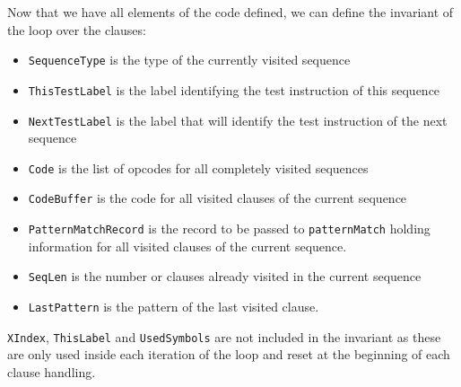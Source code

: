 \documentclass[a4paper]{memoir}
\begin{document}
Now that we have all elements of the code defined, we can define the invariant
of the loop over the clauses:

\begin{itemize}
  \item \lstinline!SequenceType! is the type of the currently visited sequence 
  \item \lstinline!ThisTestLabel! is the label identifying the test instruction of this sequence
  \item \lstinline!NextTestLabel! is the label that will identify the test
    instruction of the next sequence
  \item \lstinline!Code! is the list of opcodes for all completely visited sequences
  \item \lstinline!CodeBuffer! is the code for all visited clauses of the current sequence
  \item \lstinline!PatternMatchRecord! is the record to be passed to \lstinline!patternMatch!
        holding information for all visited clauses of the current sequence.
  \item \lstinline!SeqLen! is the number or clauses already visited in the current sequence
  \item \lstinline!LastPattern! is the pattern of the last visited clause.
\end{itemize}

\lstinline!XIndex!, \lstinline!ThisLabel! and \lstinline!UsedSymbols! are not
included in the invariant as these are only used inside
each iteration of the loop and reset at the beginning of each clause handling.
\end{document}
